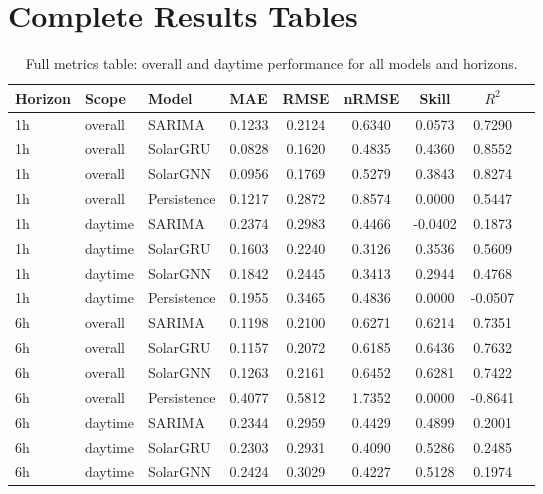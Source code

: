 \documentclass[11pt,a4paper]{article}
\begin{document}
\newpage
\appendix

\section{Complete Results Tables}
\label{app:tables}

\begin{table}[H]
\centering
\caption{Full metrics table: overall and daytime performance for all models and horizons.}
\label{tab:full_results}
\small
\begin{tabular}{llllccccc}
\toprule
\textbf{Horizon} & \textbf{Scope} & \textbf{Model} & \textbf{MAE} & \textbf{RMSE} & \textbf{nRMSE} & \textbf{Skill} & \textbf{$R^2$} \\
\midrule
1h & overall & SARIMA & 0.1233 & 0.2124 & 0.6340 & 0.0573 & 0.7290 \\
1h & overall & SolarGRU & 0.0828 & 0.1620 & 0.4835 & 0.4360 & 0.8552 \\
1h & overall & SolarGNN & 0.0956 & 0.1769 & 0.5279 & 0.3843 & 0.8274 \\
1h & overall & Persistence & 0.1217 & 0.2872 & 0.8574 & 0.0000 & 0.5447 \\
1h & daytime & SARIMA & 0.2374 & 0.2983 & 0.4466 & -0.0402 & 0.1873 \\
1h & daytime & SolarGRU & 0.1603 & 0.2240 & 0.3126 & 0.3536 & 0.5609 \\
1h & daytime & SolarGNN & 0.1842 & 0.2445 & 0.3413 & 0.2944 & 0.4768 \\
1h & daytime & Persistence & 0.1955 & 0.3465 & 0.4836 & 0.0000 & -0.0507 \\
\midrule
6h & overall & SARIMA & 0.1198 & 0.2100 & 0.6271 & 0.6214 & 0.7351 \\
6h & overall & SolarGRU & 0.1157 & 0.2072 & 0.6185 & 0.6436 & 0.7632 \\
6h & overall & SolarGNN & 0.1263 & 0.2161 & 0.6452 & 0.6281 & 0.7422 \\
6h & overall & Persistence & 0.4077 & 0.5812 & 1.7352 & 0.0000 & -0.8641 \\
6h & daytime & SARIMA & 0.2344 & 0.2959 & 0.4429 & 0.4899 & 0.2001 \\
6h & daytime & SolarGRU & 0.2303 & 0.2931 & 0.4090 & 0.5286 & 0.2485 \\
6h & daytime & SolarGNN & 0.2424 & 0.3029 & 0.4227 & 0.5128 & 0.1974 \\

\end{tabular}
\end{table}
\end{document}
